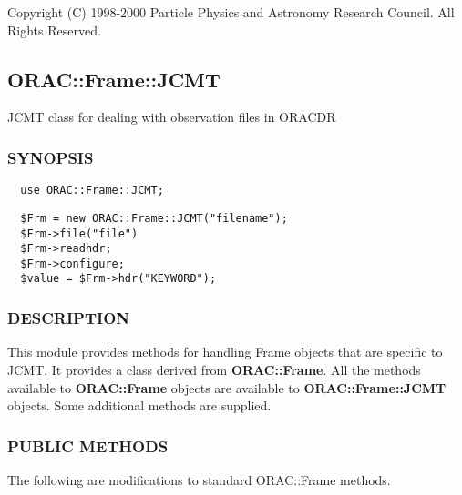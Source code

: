 Copyright (C) 1998-2000 Particle Physics and Astronomy Research
Council. All Rights Reserved.

\subsection{ORAC::Frame::JCMT\label{ORAC::Frame::JCMT}}

JCMT class for dealing with observation files in ORACDR

\subsubsection*{SYNOPSIS\label{ORAC::Frame::JCMT_SYNOPSIS}}\begin{verbatim}
  use ORAC::Frame::JCMT;
\end{verbatim}
\begin{verbatim}
  $Frm = new ORAC::Frame::JCMT("filename");
  $Frm->file("file")
  $Frm->readhdr;
  $Frm->configure;
  $value = $Frm->hdr("KEYWORD");
\end{verbatim}
\subsubsection*{DESCRIPTION\label{ORAC::Frame::JCMT_DESCRIPTION}}

This module provides methods for handling Frame objects that
are specific to JCMT. It provides a class derived from \textbf{ORAC::Frame}.
All the methods available to \textbf{ORAC::Frame} objects are available
to \textbf{ORAC::Frame::JCMT} objects. Some additional methods are supplied.

\subsubsection*{PUBLIC METHODS\label{ORAC::Frame::JCMT_PUBLIC_METHODS}}

The following are modifications to standard ORAC::Frame methods.

